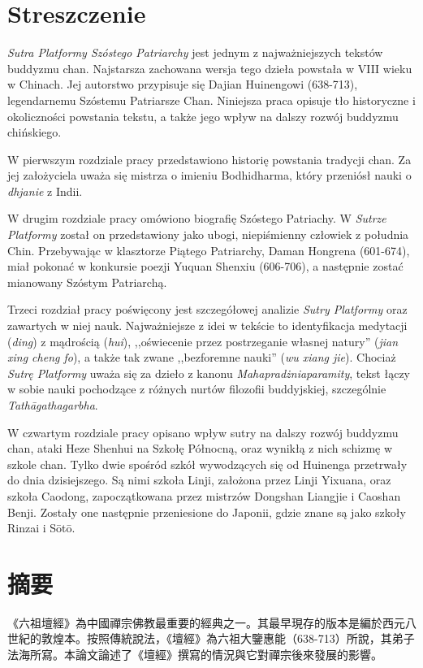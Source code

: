 \makeatletter
\@openrightfalse
\makeatother
\chapter*{Streszczenie}
\textit{Sutra Platformy Szóstego Patriarchy} jest jednym z najważniejszych tekstów buddyzmu chan.
Najstarsza zachowana wersja tego dzieła powstała w VIII wieku w Chinach.
Jej autorstwo przypisuje się Dajian Huinengowi (638-713), legendarnemu Szóstemu Patriarsze Chan.
Niniejsza praca opisuje tło historyczne i okoliczności powstania tekstu, a także jego wpływ na dalszy rozwój buddyzmu chińskiego.

W pierwszym rozdziale pracy przedstawiono historię powstania tradycji chan. Za jej założyciela uważa się mistrza o imieniu Bodhidharma, który przeniósł nauki o \textit{dhjanie} z Indii.

W drugim rozdziale pracy omówiono biografię Szóstego Patriachy.
W \textit{Sutrze Platformy} został on przedstawiony jako ubogi, niepiśmienny człowiek z południa Chin.
Przebywając w klasztorze Piątego Patriarchy, Daman Hongrena (601-674), miał pokonać w konkursie poezji Yuquan Shenxiu (606-706), a następnie zostać mianowany Szóstym Patriarchą.

Trzeci rozdział pracy poświęcony jest szczegółowej analizie \textit{Sutry Platformy} oraz zawartych w niej nauk.
Najważniejsze z idei w tekście to identyfikacja medytacji (\textit{ding}) z mądrością (\textit{hui}), ,,oświecenie przez postrzeganie własnej natury'' (\textit{jian xing cheng fo}), a także tak zwane ,,bezforemne nauki'' (\textit{wu xiang jie}).
Chociaż \textit{Sutrę Platformy} uważa się za dzieło z kanonu \textit{Mahapradżniaparamity}, tekst łączy w sobie nauki pochodzące z różnych nurtów filozofii buddyjskiej, szczególnie \textit{Tathāgathagarbha}.

W czwartym rozdziale pracy opisano wpływ sutry na dalszy rozwój buddyzmu chan, ataki Heze Shenhui na Szkołę Północną, oraz wynikłą z nich schizmę w szkole chan.
Tylko dwie spośród szkół wywodzących się od Huinenga przetrwały do dnia dzisiejszego. Są nimi szkoła Linji, założona przez Linji Yixuana, oraz szkoła Caodong, zapoczątkowana przez mistrzów Dongshan Liangjie i Caoshan Benji.
Zostały one następnie przeniesione do Japonii, gdzie znane są jako szkoły Rinzai i Sōtō.

\chapter*{摘要}
《六祖壇經》為中國禪宗佛教最重要的經典之一。其最早現存的版本是編於西元八世紀的敦煌本。按照傳統說法，《壇經》為六祖大鑒惠能（638-713）所說，其弟子法海所寫。本論文論述了《壇經》撰寫的情況與它對禪宗後來發展的影響。

